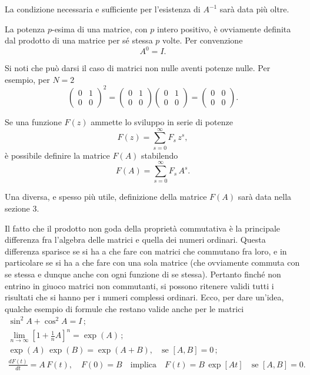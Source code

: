 \documentclass[11pt, a4paper]{book}
\numberwithin{equation}{section}
\begin{document}
La condizione necessaria e sufficiente per l'esistenza di $A^{-1}$ sarà data più oltre.

La potenza $p$-esima di una matrice, con $p$ intero positivo, è ovviamente definita dal prodotto di una matrice per sé stessa $p$ volte. Per convenzione
\begin{equation}
    A^0 = I.
    \tag{19}
\end{equation}

Si noti che può darsi il caso di matrici non nulle aventi potenze nulle. Per esempio, per $N = 2$
\[
\begin{pmatrix} 0 & 1 \\ 0 & 0 \end{pmatrix}^2
=
\begin{pmatrix} 0 & 1 \\ 0 & 0 \end{pmatrix}
\begin{pmatrix} 0 & 1 \\ 0 & 0 \end{pmatrix}
=
\begin{pmatrix} 0 & 0 \\ 0 & 0 \end{pmatrix}.
\]

Se una funzione $F(z)$ ammette lo sviluppo in serie di potenze
\begin{equation}
    F(z) = \sum_{s=0}^{\infty} F_s\, z^s,
    \tag{20}
\end{equation}
è possibile definire la matrice $F(A)$ stabilendo
\begin{equation}
    F(A) = \sum_{s=0}^{\infty} F_s\, A^s.
    \tag{21}
\end{equation}

Una diversa, e spesso più utile, definizione della matrice $F(A)$ sarà data nella sezione 3.

Il fatto che il prodotto non goda della proprietà commutativa è la principale differenza fra l'algebra delle matrici e quella dei numeri ordinari. Questa differenza sparisce se si ha a che fare con matrici che commutano fra loro, e in particolare se si ha a che fare con una sola matrice (che ovviamente commuta con se stessa e dunque anche con ogni funzione di se stessa). Pertanto finché non entrino in giuoco matrici non commutanti, si possono ritenere validi tutti i risultati che si hanno per i numeri complessi ordinari. Ecco, per dare un'idea, qualche esempio di formule che restano valide anche per le matrici
\begin{gather*}
    \sin^2 A + \cos^2 A = I\,; \\
    \lim_{n \to \infty} \left[1 + \tfrac{1}{n} A\right]^n = \exp(A)\,; \\
    \exp(A)\,\exp(B) = \exp(A+B), \quad \text{se } [A,B] = 0\,; \\
    \frac{dF(t)}{dt} = A\,F(t),\quad F(0) = B \quad \text{implica} \quad
    F(t) = B\,\exp[At] \quad \text{se } [A, B] = 0.
\end{gather*}
\end{document}
